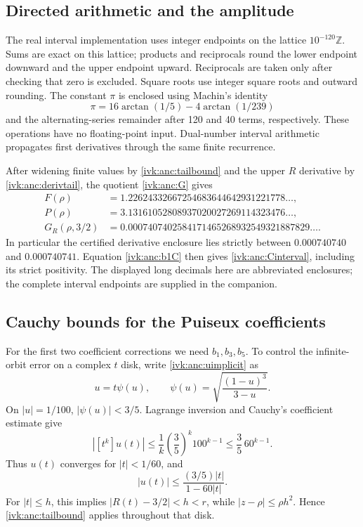 \documentclass[11pt,letterpaper]{article}
\theoremstyle{remark}\newtheorem{remark}[theorem]{Remark}
\begin{document}
\subsection{Directed arithmetic and the amplitude}
The real interval implementation uses integer endpoints on the
lattice $10^{-120}\mathbb Z$. Sums are exact on this lattice;
products and reciprocals round the lower endpoint downward and
the upper endpoint upward. Reciprocals are taken only after
checking that zero is excluded. Square roots use integer square
roots and outward rounding. The constant $\pi$ is enclosed using
Machin's identity
\begin{equation}\label{ivk:anc:machin}
 \pi=16\arctan(1/5)-4\arctan(1/239)
\end{equation}
and the alternating-series remainder after 120 and 40 terms,
respectively. These operations have no floating-point input.
Dual-number interval arithmetic propagates first derivatives
through the same finite recurrence.

After widening finite values by \eqref{ivk:anc:tailbound} and the upper
$R$ derivative by \eqref{ivk:anc:derivtail}, the quotient \eqref{ivk:anc:G} gives
\begin{align*}
 F(\rho)&=1.22624332667254683644642931221778\ldots,\\
 P(\rho)&=3.13161052808937020027269114323476\ldots,\\
 G_R(\rho,3/2)&=0.0007407402584171465268932549321887829\ldots.
\end{align*}
In particular the certified derivative enclosure lies strictly
between $0.000740740$ and $0.000740741$. Equation \eqref{ivk:anc:b1C}
then gives \eqref{ivk:anc:Cinterval}, including its strict positivity.
The displayed long decimals here are abbreviated enclosures;
the complete interval endpoints are supplied in the companion.

\subsection{Cauchy bounds for the Puiseux coefficients}
For the first two coefficient corrections we need $b_1,b_3,b_5$.
To control the infinite-orbit error on a complex $t$ disk, write
\eqref{ivk:anc:uimplicit} as
\[
 u=t\psi(u),\qquad
 \psi(u)=\sqrt{\frac{(1-u)^3}{3-u}}.
\]
On $|u|=1/100$, $|\psi(u)|<3/5$. Lagrange inversion and Cauchy's
coefficient estimate give
\[
 |[t^k]u(t)|\le\frac1k\left(\frac35\right)^k100^{k-1}
       \le\frac35\,60^{k-1}.
\]
Thus $u(t)$ converges for $|t|<1/60$, and
\begin{equation}\label{ivk:anc:ubound}
 |u(t)|\le\frac{(3/5)|t|}{1-60|t|}.
\end{equation}
For $|t|\le h$, this implies $|R(t)-3/2|<h<r$, while
$|z-\rho|\le\rho h^2$. Hence \eqref{ivk:anc:tailbound} applies throughout
that disk.
\end{document}
